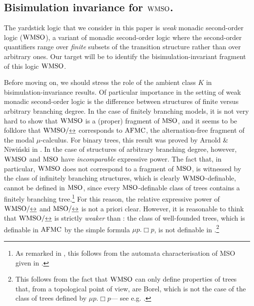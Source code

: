 \subsection{Bisimulation invariance for $\mathrm{WMSO}$.}
The yardstick logic that we consider in this paper is \emph{weak} monadic
second-order logic ($\mathrm{WMSO}$), a variant of monadic second-order logic where
the second-order quantifiers range over \emph{finite} subsets of the
transition structure rather than over arbitrary ones.
Our target will be to identify the bisimulation-invariant fragment of this
logic $\mathrm{WMSO}$.

Before moving on, we should stress the role of the ambient class $K$ in
bisimulation-invariance results.
Of particular importance in the setting of weak monadic second-order logic is
the difference between structures of finite versus arbitrary branching degree.
In the case of finitely branching models, it is not very hard to show that
$\mathrm{WMSO}$ is a (proper) fragment of $\mathrm{MSO}$, and it seems to be folklore that
$\mathrm{WMSO}/{\mathrel{\underline{\leftrightarrow}}}$ corresponds to $\mathrm{AFMC}$, the alternation-free fragment of the
modal $\mu$-calculus.
For binary trees, this result was proved by Arnold \& Niwi{\'n}ski in
\cite{ArnoldN01}.
In the case of structures of arbitrary branching degree, however, $\mathrm{WMSO}$
and $\mathrm{MSO}$ have \emph{incomparable} expressive power.
The fact that, in particular, $\mathrm{WMSO}$ does not correspond to a fragment of
$\mathrm{MSO}$, is witnessed by the class of infinitely branching structures, which
is clearly $\mathrm{WMSO}$-definable, cannot be defined in $\mathrm{MSO}$, since every
$\mathrm{MSO}$-definable class of trees contains a finitely branching
tree.\footnote{As remarked in \cite{CateF11}, this follows from the automata characterisation of MSO given in \cite{Walukiewicz96}.} %
For this reason, the relative expressive power of $\mathrm{WMSO}/{\mathrel{\underline{\leftrightarrow}}}$ and
$\mathrm{MSO}/{\mathrel{\underline{\leftrightarrow}}}$ is not a priori clear.
However, it is reasonable to think that $\mathrm{WMSO}/{\mathrel{\underline{\leftrightarrow}}}$ is strictly \emph{weaker} than \afmc: the class of well-founded trees, which is definable in $\mathrm{AFMC}$ by
the simple formula $\mu p. \Box p$, is not definable in \wmso.\footnote{This follows from the fact that $\mathrm{WMSO}$ can only define properties of trees that, from a topological point of view, are Borel, which is not the case of the class of trees defined by $\mu p. \Box p$--- see e.g. \cite{CateF11}.}
